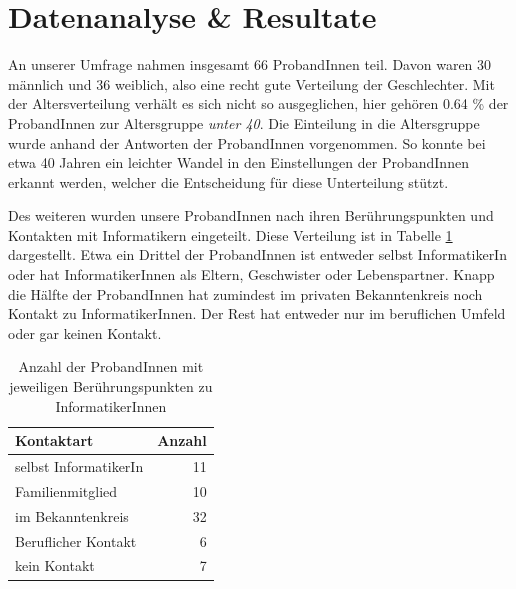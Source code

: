 \documentclass[de]{agse-empir-report}\usepackage[]{graphicx}\usepackage[]{color}
\newenvironment{knitrout}{}{} %
\begin{document}
\section[sl]{Datenanalyse \& Resultate} 




An unserer Umfrage nahmen insgesamt 66 ProbandInnen teil. Davon waren 30 m\"annlich und 36 weiblich, also eine recht gute Verteilung der Geschlechter. Mit der Altersverteilung verh\"alt es sich nicht so ausgeglichen, hier gehören 0.64 \% der ProbandInnen zur Altersgruppe \emph{unter 40}. Die Einteilung in die Altersgruppe wurde anhand der Antworten der ProbandInnen vorgenommen. So konnte bei etwa 40 Jahren ein leichter Wandel in den Einstellungen der ProbandInnen erkannt werden, welcher die Entscheidung f\"ur diese Unterteilung st\"utzt.

Des weiteren wurden unsere ProbandInnen nach ihren Ber\"uhrungspunkten und Kontakten mit Informatikern eingeteilt. Diese Verteilung ist in Tabelle \ref{tab:contact} dargestellt. Etwa ein Drittel der ProbandInnen ist entweder selbst InformatikerIn oder hat InformatikerInnen als Eltern, Geschwister oder Lebenspartner. Knapp die H\"alfte der ProbandInnen hat zumindest im privaten Bekanntenkreis noch Kontakt zu InformatikerInnen. Der Rest hat entweder nur im beruflichen Umfeld oder gar keinen Kontakt.

\begin{table}
   \centering
\begin{knitrout}
\color{fgcolor}
\begin{tabular}{lr}
\toprule
Kontaktart & Anzahl\\
\midrule
selbst InformatikerIn & 11\\
Familienmitglied & 10\\
im Bekanntenkreis & 32\\
Beruflicher Kontakt & 6\\
kein Kontakt & 7\\
\bottomrule
\end{tabular}


\end{knitrout}
   \caption{Anzahl der ProbandInnen mit jeweiligen Ber\"uhrungspunkten zu InformatikerInnen}
   \label{tab:contact}
\end{table}

\end{document}
